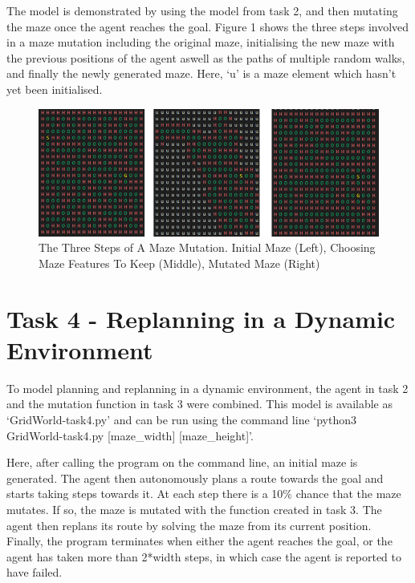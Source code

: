 \documentclass{article}
\begin{document}
	The model is demonstrated by using the model from task 2, and then mutating the maze once the agent reaches the goal. Figure 1 shows the three steps involved in a maze mutation including the original maze, initialising the new maze with the previous positions of the agent aswell as the paths of multiple random walks, and finally the newly generated maze. Here, ‘u’ is a maze element which hasn’t yet been initialised. 

\begin{figure}[ht]
	\centering
	\includegraphics[width=\textwidth]{assets/mutateMaze.png}
	\caption{The Three Steps of A Maze Mutation. Initial Maze (Left), Choosing Maze Features To Keep (Middle), Mutated Maze (Right)}
\end{figure}


\section{Task 4 - Replanning in a Dynamic Environment}\label{sec:test-design}

	To model planning and replanning in a dynamic environment, the agent in task 2 and the mutation function in task 3 were combined. This model is available as ‘GridWorld-task4.py’ and can be run using the command line ‘python3 GridWorld-task4.py [maze\_width] [maze\_height]’.

Here, after calling the program on the command line, an initial maze is generated. The agent then autonomously plans a route towards the goal and starts taking steps towards it. At each step there is a 10\% chance that the maze mutates. If so, the maze is mutated with the function created in task 3. The agent then replans its route by solving the maze from its current position. Finally, the program terminates when either the agent reaches the goal, or the agent has taken more than 2*width steps, in which case the agent is reported to have failed. \\
\end{document}
